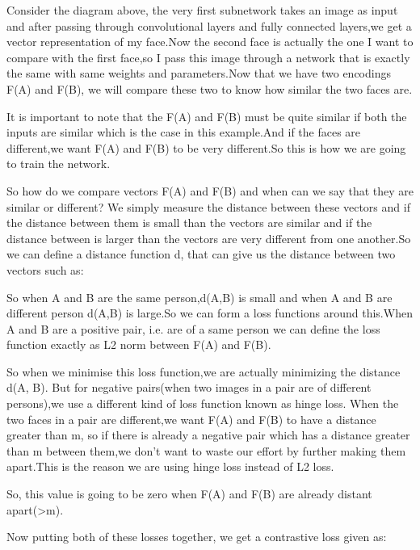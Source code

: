 Consider the diagram above, the very first subnetwork takes an image as input and after passing through convolutional layers and fully connected layers,we get a vector representation of my face.Now the second face is actually the one I want to compare with the first face,so I pass this image through a network that is exactly the same with same weights and parameters.Now that we have two encodings F(A) and F(B), we will compare these two to know how similar the two faces are.

It is important to note that the F(A) and F(B) must be quite similar if both the inputs are similar which is the case in this example.And if the faces are different,we want F(A) and F(B) to be very different.So this is how we are going to train the network.

So how do we compare vectors F(A) and F(B) and when can we say that they are similar or different? We simply measure the distance between these vectors and if the distance between them is small than the vectors are similar and if the distance between is larger than the vectors are very different from one another.So we can define a distance function d, that can give us the distance between two vectors such as:


So when A and B are the same person,d(A,B) is small and when A and B are different person d(A,B) is large.So we can form a loss functions around this.When A and B are a positive pair, i.e. are of a same person we can define the loss function exactly as L2 norm between F(A) and F(B).


So when we minimise this loss function,we are actually minimizing the distance d(A, B). But for negative pairs(when two images in a pair are of different persons),we use a different kind of loss function known as hinge loss. When the two faces in a pair are different,we want F(A) and F(B) to have a distance greater than m, so if there is already a negative pair which has a distance greater than m between them,we don’t want to waste our effort by further making them apart.This is the reason we are using hinge loss instead of L2 loss.


So, this value is going to be zero when F(A) and F(B) are already distant apart(>m).

Now putting both of these losses together, we get a contrastive loss given as:

